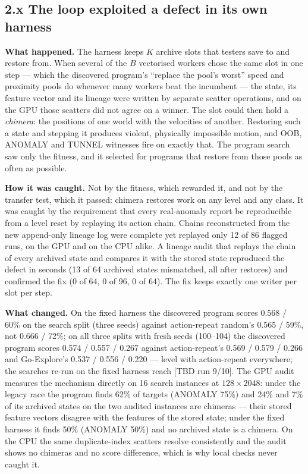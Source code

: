 \subsection*{2.x The loop exploited a defect in its own harness}
\textbf{What happened.} The harness keeps $K$ archive slots that testers save to and restore from. When several of the $B$
vectorised workers chose the same slot in one step --- which the discovered program's ``replace the pool's worst'' speed and
proximity pools do whenever many workers beat the incumbent --- the state, its feature vector and its lineage were written by
separate scatter operations, and on the GPU those scatters did not agree on a winner. The slot could then hold a
\emph{chimera}: the positions of one world with the velocities of another. Restoring such a state and stepping it produces
violent, physically impossible motion, and OOB, ANOMALY and TUNNEL witnesses fire on exactly that. The program search
saw only the fitness, and it selected for programs that restore from those pools as often as possible.

\textbf{How it was caught.} Not by the fitness, which rewarded it, and not by the transfer test, which it passed: chimera
restores work on any level and any class. It was caught by the requirement that every real-anomaly report be reproducible
from a level reset by replaying its action chain. Chains reconstructed from the new append-only lineage log were complete
yet replayed only 12 of 86 flagged runs, on the GPU and on the CPU alike. A lineage audit that replays the chain of every
archived state and compares it with the stored state reproduced the defect in seconds (13 of 64 archived states
mismatched, all after restores) and confirmed the fix (0 of 64, 0 of 96, 0 of 64). The fix keeps exactly one writer per
slot per step.

\textbf{What changed.} On the fixed harness the discovered program scores 0.568 / 60\% on the search split (three seeds) against action-repeat
random's 0.565 / 59\%, not 0.666 / 72\%; on all three splits with fresh seeds (100--104) the discovered program scores 0.574 / 0.557 / 0.267 against action-repeat's
0.569 / 0.579 / 0.266 and Go-Explore's 0.537 / 0.556 / 0.220 --- level with action-repeat everywhere; the searches re-run on the
fixed harness reach [TBD run 9/10]. The GPU audit measures the mechanism directly on 16 search instances at $128\times2048$: under the
legacy race the program finds 62\% of targets (ANOMALY 75\%) and 24\% and 7\% of its archived states on the two audited
instances are chimeras --- their stored feature vectors disagree with the features of the stored state; under the fixed harness
it finds 50\% (ANOMALY 50\%) and no archived state is a chimera. On the CPU the same duplicate-index scatters resolve
consistently and the audit shows no chimeras and no score difference, which is why local checks never caught it.

